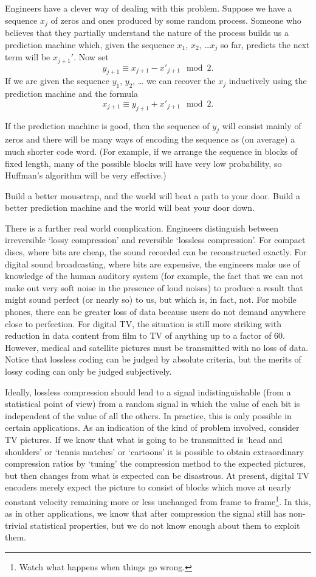 Engineers have a clever way of dealing with this problem.
Suppose we have a sequence $x_{j}$ of zeros and ones
produced by some random process. Someone who believes that
they partially understand the nature of the process
builds us a prediction machine
which, given the sequence $x_{1}$, $x_{2}$, \dots $x_{j}$ so far,
predicts the next term will be $x_{j+1}'$. Now set
\[y_{j+1}\equiv x_{j+1}-x'_{j+1}\mod 2.\]
If we are given the sequence $y_{1}$, $y_{2}$, \dots
we can recover the $x_{j}$ inductively using the
prediction machine and the formula
\[x_{j+1}\equiv y_{j+1}+x'_{j+1}\mod 2.\]

If the prediction machine is good, then the
sequence of $y_{j}$ will consist mainly of zeros
and there will be many ways of encoding the sequence 
as (on average) a much shorter code word.
(For example, if we arrange the sequence in blocks of 
fixed length, many of the possible blocks will have very low 
probability, so Huffman's algorithm will be very effective.)


Build a better mousetrap, and the world will beat a path to your door.
Build a better prediction machine and the world will beat your door down.

There is a further real world complication.
Engineers
distinguish between irreversible
`lossy compression'
and reversible `lossless compression'.
For compact discs, where bits are cheap,
the sound recorded can be reconstructed
exactly. For digital sound broadcasting, where
bits are expensive, the engineers make use
of knowledge of the human auditory system
(for example, the fact that we can not
make out very soft noise in the presence
of loud noises) to produce a result that might
sound perfect (or nearly so) to us, but which
is, in fact, not. For mobile phones, there can be
greater loss of data because users
do not demand anywhere close to 
perfection.
For digital TV, the situation is still more
striking with reduction in data content from
film to TV of anything up to a factor of  60.
However, medical and satellite pictures must
be transmitted with no loss of data.
Notice that lossless coding can be judged by
absolute criteria, but the merits of lossy
coding can only be judged subjectively.

Ideally, lossless compression should
lead to a signal indistinguishable (from a statistical
point of view) from a random signal
in which the value of each bit is independent
of the value of all the others.
In practice, this is only possible in certain
applications. As an indication of the kind of
problem involved, consider TV pictures. If
we know that what is going to be transmitted is
`head and shoulders' or `tennis matches' or
`cartoons' it is possible to obtain extraordinary
compression ratios by `tuning' the compression method
to the expected pictures, but then changes from
what is expected can be disastrous. At present,
digital TV encoders merely expect the picture to
consist of blocks which move at nearly constant
velocity remaining more or less unchanged from
frame to frame\footnote{Watch what happens when
things go wrong.}. In this, as in other applications,
we know that after compression
the signal still has non-trivial
statistical properties, 
but we do not know
enough about them to exploit them.

